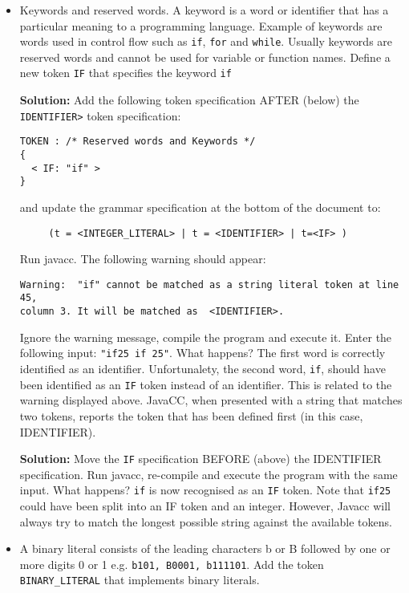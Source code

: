 \documentclass{article}
\begin{document}
\begin{itemize}

\item Keywords and reserved words. A keyword is a word or identifier that has a particular meaning to a programming language. Example of keywords are words used in control flow such as \verb+if+, \verb+for+ and \verb+while+. Usually keywords are reserved words and cannot be used for variable or function names. 
Define a new token \verb+IF+ that specifies the keyword \verb+if+

\textbf{Solution:} Add the following token specification AFTER (below) the \verb+IDENTIFIER>+ token specification:
\begin{verbatim}
TOKEN : /* Reserved words and Keywords */
{
  < IF: "if" >
}
\end{verbatim}
and update the grammar specification at the bottom of the document to:
\begin{verbatim}
     (t = <INTEGER_LITERAL> | t = <IDENTIFIER> | t=<IF> )
\end{verbatim}
Run javacc. The following warning should appear:
\begin{verbatim}
Warning:  "if" cannot be matched as a string literal token at line 45, 
column 3. It will be matched as  <IDENTIFIER>.
\end{verbatim}
Ignore the warning message, compile the program and execute it. Enter the following input: \verb+"if25 if 25"+. What happens? The first word is correctly identified as an identifier. Unfortunalety, the second word, \verb+if+, should have been identified as an \verb+IF+ token instead of an identifier. This is related to the warning displayed above. JavaCC, when presented with a string that matches two tokens, reports the token that has been defined first (in this case, IDENTIFIER). 

\textbf{Solution:} Move the \verb+IF+ specification BEFORE (above) the IDENTIFIER specification. Run javacc, re-compile and execute the program with the same input. What happens? \verb+if+ is now recognised as an \verb+IF+ token. Note that \verb+if25+ could have been split into an IF token and an integer. However, Javacc will always try to match the longest possible string against the available tokens.

\item A binary literal consists of the leading characters b or B followed by one or more digits 0 or 1 e.g. {\tt b101, B0001, b111101}. Add the token \verb+BINARY_LITERAL+ that implements binary literals.


\end{itemize}
\end{document}

